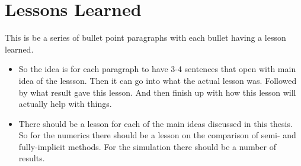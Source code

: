 \section{Lessons Learned}
This is be a series of bullet point paragraphs with each bullet having a lesson learned.

\begin{itemize}
  \item So the idea is for each paragraph to have 3-4 sentences that open with main idea of the lessson. Then it can go into what the actual lesson was. Followed by what result gave this lesson. And then finish up with how this lesson will actually help with things.
  \item There should be a lesson for each of the main ideas discussed in this thesis. So for the numerics there should be a lesson on the comparison of semi- and fully-implicit methods. For the simulation there should be a number of results. 
\end{itemize}
